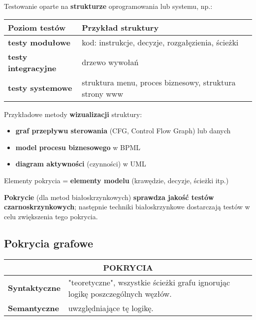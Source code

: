 \documentclass[../main.tex]{subfiles}
\begin{document}
    Testowanie oparte na \textbf{strukturze} oprogramowania lub systemu, np.:

    \begin{tabular}{p{4cm} || p{12cm}}
        \textbf{Poziom testów}      & \textbf{Przykład struktury}                            \\
        \hline
        \hline
        \textbf{testy modułowe}     & kod: instrukcje, decyzje, rozgałęzienia, ścieżki       \\
        \hline
        \textbf{testy integracyjne} & drzewo wywołań                                         \\
        \hline
        \textbf{testy systemowe}    & struktura menu, proces biznesowy, struktura strony www \\
    \end{tabular}


    Przykładowe metody \textbf{wizualizacji} struktury:
    \begin{itemize}
        \item \textbf{graf przepływu sterowania} (CFG, Control Flow Graph) lub danych
        \item \textbf{model procesu biznesowego} w BPML
        \item \textbf{diagram aktywności} (czynności) w UML
    \end{itemize}
    Elementy pokrycia = \textbf{elementy modelu} (krawędzie, decyzje, ścieżki itp.)

    \textbf{Pokrycie} (dla metod białoskrzynkowych) \textbf{sprawdza jakość testów czarnoskrzynkowych}; następnie techniki
    białoskrzynkowe dostarczają testów w celu zwiększenia tego pokrycia.

    \subsection{Pokrycia grafowe}

    \begin{table}[H]
        \begin{center}
            \begin{tabular}{p{8cm} | p{8cm}}
                \multicolumn{2}{c}{\textbf{POKRYCIA}} \\
                \hline
                \textbf{Syntaktyczne} & "teoretyczne", wszystkie ścieżki grafu ignorując logikę poszczególnych węzłów. \\
                \hline
                \textbf{Semantyczne}  & uwzględniające tę logikę.                                                      \\

            \end{tabular}
        \end{center}
    \end{table}
\end{document}
